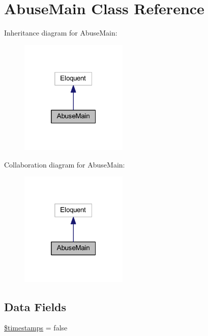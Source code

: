 \hypertarget{class_abuse_main}{}\section{Abuse\+Main Class Reference}
\label{class_abuse_main}


Inheritance diagram for Abuse\+Main\+:
\nopagebreak
\begin{figure}[H]
\begin{center}
\leavevmode
\includegraphics[width=145pt]{class_abuse_main__inherit__graph}
\end{center}
\end{figure}


Collaboration diagram for Abuse\+Main\+:
\nopagebreak
\begin{figure}[H]
\begin{center}
\leavevmode
\includegraphics[width=145pt]{class_abuse_main__coll__graph}
\end{center}
\end{figure}
\subsection*{Data Fields}
\begin{DoxyCompactItemize}
\item 
\hyperlink{class_abuse_main_a51267c24c8fae742ed8f9be0ba6085ee}{\$timestamps} = false
\end{DoxyCompactItemize}
